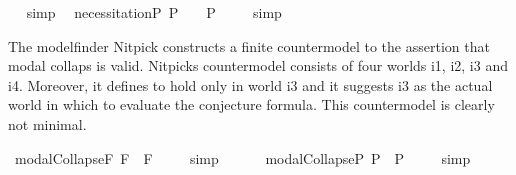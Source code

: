 \begin{isabellebody}
\isadelimproof
\ %
\endisadelimproof
%
\isatagproof
{}\isamarkupfalse%
\ simp\ \isamarkupfalse%
%
\endisatagproof
{\isafoldproof}%
%
\isadelimproof
%
\endisadelimproof
\isanewline
{}\isamarkupfalse%
\ necessitationP{\isacharcolon}\ {\isachardoublequoteopen}{\isacharbrackleft}{\isasymphi}\isactrlsup P{\isacharbrackright}\ {\isacharequal}\ {\isasymtop}\ {\isasymlongrightarrow}\ {\isacharbrackleft}\isactrlbold {\isasymbox}{\isacharparenleft}{\isasymphi}\isactrlsup P{\isacharparenright}{\isacharbrackright}\ {\isacharequal}\ {\isasymtop}{\isachardoublequoteclose}%
\isadelimproof
\ %
\endisadelimproof
%
\isatagproof
{}\isamarkupfalse%
\ simp\ \isamarkupfalse%
%
\endisatagproof
{\isafoldproof}%
%
\isadelimproof
%
\endisadelimproof
%
\isamarkuptrue%
%
\begin{isamarkuptext}%
The modelfinder Nitpick constructs a finite countermodel to the assertion
  that modal collaps is valid. Nitpicks countermodel consists of four worlds i1, i2, i3 and i4.
  Moreover, it defines  \isa{{\isasymphi}} to hold only in world i3 and it suggests i3 as the actual 
  world in which to evaluate the conjecture formula. This countermodel is clearly not minimal.%
\end{isamarkuptext}%
\isamarkuptrue%
\isamarkupfalse%
\ modalCollapseF{\isacharcolon}\ {\isachardoublequoteopen}{\isacharbrackleft}{\isasymphi}\isactrlsup F\ \isactrlbold {\isasymrightarrow}\ \isactrlbold {\isasymbox}{\isacharparenleft}{\isasymphi}\isactrlsup F{\isacharparenright}{\isacharbrackright}\ {\isacharequal}\ {\isasymtop}{\isachardoublequoteclose}%
\isadelimproof
\ %
\endisadelimproof
%
\isatagproof
{}\isamarkupfalse%
\ simp%
\endisatagproof
{\isafoldproof}%
%
\isadelimproof
%
\endisadelimproof
\ \isamarkupfalse%
%
\isadelimproof
\ %
\endisadelimproof
%
\isatagproof
{}\isamarkupfalse%
\ %
%
\endisatagproof
{\isafoldproof}%
%
\isadelimproof
%
\endisadelimproof
\isanewline
{}\isamarkupfalse%
\ modalCollapseP{\isacharcolon}\ {\isachardoublequoteopen}{\isacharbrackleft}{\isasymphi}\isactrlsup P\ \isactrlbold {\isasymrightarrow}\ \isactrlbold {\isasymbox}{\isacharparenleft}{\isasymphi}\isactrlsup P{\isacharparenright}{\isacharbrackright}\ {\isacharequal}\ {\isasymtop}{\isachardoublequoteclose}%
\isadelimproof
\ %
\endisadelimproof
%
\isatagproof
{}\isamarkupfalse%
\ simp%

\end{isabellebody}
